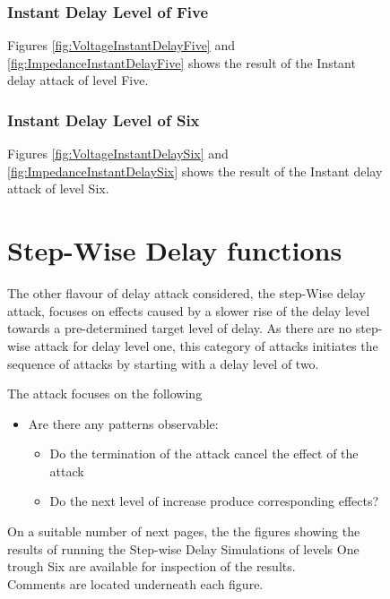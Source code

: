 \begin{item}
\begin{figure}[H]
\subsubsection{Instant Delay Level of Five}
Figures \ref{fig:VoltageInstantDelayFive} and \ref{fig:ImpedanceInstantDelayFive} shows the result of the Instant delay attack of level Five. 

\subsubsection{Instant Delay Level of Six}
Figures \ref{fig:VoltageInstantDelaySix} and \ref{fig:ImpedanceInstantDelaySix} shows the result of the Instant delay attack of level Six. 








\newpage
\section{Step-Wise Delay functions}
The other flavour of delay attack considered, the step-Wise delay attack, focuses on effects caused by a slower rise of the delay level towards a pre-determined target level of delay. As there are no step-wise attack for delay level one, this category of attacks initiates the sequence of attacks by starting with a delay level of two.

The attack focuses on the following 
\begin{itemize}
  What are the effects of repetitive increases of the delay level by one for different number of repetitions?
\item  Are there any patterns observable:
\begin{itemize}
\item     Do the termination of the attack cancel the effect of the attack
 \item    Do the next level of increase produce corresponding effects? 
\end{itemize}

\end{itemize}



On a suitable number of next pages, the the figures showing the results of running the Step-wise Delay Simulations of levels One trough Six are available for inspection of the results. \\ 
Comments are located underneath each figure.



















\end{figure}
\end{item}
